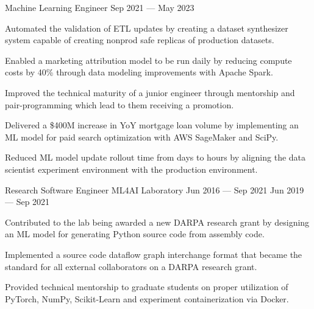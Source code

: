\begin{cventries}
  \cventry
    {Machine Learning Engineer} %
    {} %
    {} %
    {Sep 2021 --- May 2023} %
    {
      \vspace{-0.1cm}
      \begin{cvitems} %
        \item Automated the validation of ETL updates by creating a dataset synthesizer system capable of creating nonprod safe replicas of production datasets.
        \item Enabled a marketing attribution model to be run daily by reducing compute costs by 40\% through data modeling improvements with Apache Spark.
        \item Improved the technical maturity of a junior engineer through mentorship and pair-programming which lead to them receiving a promotion.
        \item Delivered a \$400M increase in YoY mortgage loan volume by implementing an ML model for paid search optimization with AWS SageMaker and SciPy.
        \item Reduced ML model update rollout time from days to hours by aligning the data scientist experiment environment with the production environment.
      \end{cvitems}
    }
  \vspace{.2cm}
  \cventry
    {Research Software Engineer} %
    {ML4AI Laboratory} %
    {Jun 2016 --- Sep 2021} %
    {Jun 2019 --- Sep 2021} %
    {
      \vspace{-0.1cm}
      \begin{cvitems} %
        \item Contributed to the lab being awarded a new DARPA research grant by designing an ML model for generating Python source code from assembly code.
        \item Implemented a source code dataflow graph interchange format that became the standard for all external collaborators on a DARPA research grant.
        \item Provided technical mentorship to graduate students on proper utilization of PyTorch, NumPy, Scikit-Learn and experiment containerization via Docker.
      \end{cvitems}
    }
    \vspace{.07cm}

\end{cventries}
